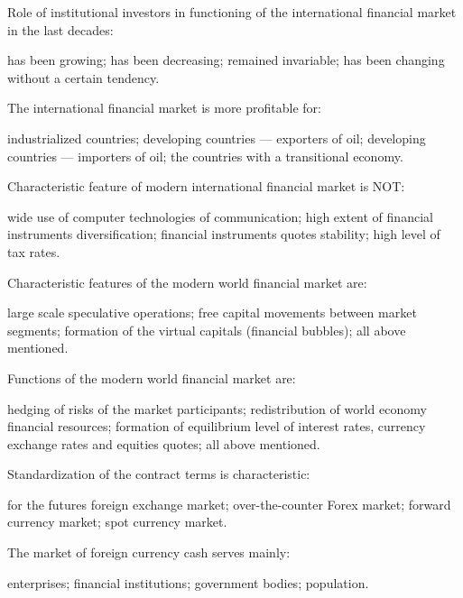 \documentclass[12pt, table]{exam}
\begin{document}
\begin{questions}
\begin{multicols}{2}
\begin{choices}
	 \end{choices}
\question Role of institutional investors in functioning of the international financial market in the last decades:
	 \begin{choices}
	 \CC has been growing;
	 \choice has been decreasing;
	 \choice remained invariable;
	 \choice has been changing without a certain tendency.
	 \end{choices}
\question The international financial market is more profitable for:
	 \begin{choices}
	 \choice industrialized countries;
	 \CC developing countries — exporters of oil;
	 \choice developing countries — importers of oil;
	 \choice the countries with a transitional economy.
	 \end{choices}
\question Characteristic feature of modern international financial market is NOT:
	 \begin{choices}
	 \choice wide use of computer technologies of communication;
	 \CC high extent of financial instruments diversification;
	 \choice financial instruments quotes stability;
	 \choice high level of tax rates.
	 \end{choices}
\question Characteristic features of the modern world financial market are:
	 \begin{choices}
	 \choice large scale speculative operations;
	 \CC free capital movements between market segments;
	 \choice formation of the virtual capitals (financial bubbles);
	 \choice all above mentioned.
	 \end{choices}
\question Functions of the modern world financial market are:
	 \begin{choices}
	 \choice hedging of risks of the market participants;
	 \CC redistribution of world economy financial resources;
	 \choice formation of equilibrium level of interest rates, currency exchange rates and equities quotes;
	 \choice all above mentioned.
	 \end{choices}
\question Standardization of the contract terms is characteristic:
	 \begin{choices}
	 \choice for the futures foreign exchange market;
	 \choice over-the-counter Forex market;
	 \CC forward currency market;
	 \choice spot currency market.
	 \end{choices}
\question The market of foreign currency cash serves mainly:
	 \begin{choices}
	 \choice enterprises;
	 \choice financial institutions;
	 \CC government bodies;
	 \choice population.
	 \end{choices}

\end{multicols}
\end{questions}
\end{document}
